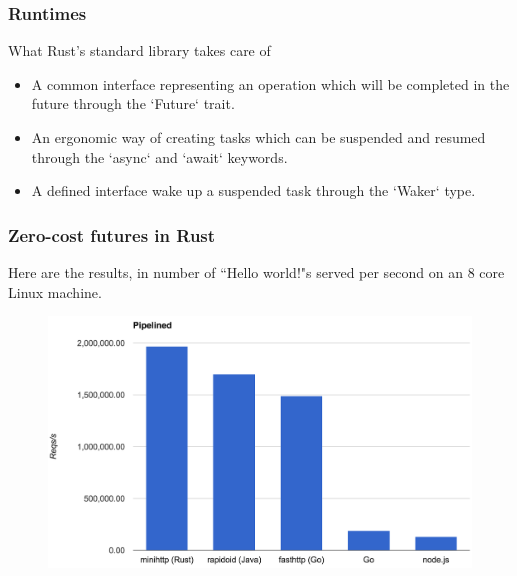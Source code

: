 \begin{frame}[fragile]
    \frametitle{Runtimes}
    {\color{red}What Rust's standard library takes care of}
    \begin{itemize}
        \item A {\color{red}common interface} representing an operation which will be completed in the future through the `Future` trait.
        \item An ergonomic way of {\color{red}creating tasks} which can be suspended and resumed through the `async` and `await` keywords.
        \item A defined interface wake up a suspended task through the `Waker` type.
    \end{itemize}
\end{frame}


\begin{frame}[fragile]
    \frametitle{Zero-cost futures in Rust}
% 
% 
Here are the results, in number of “Hello world!"s served per second on an 8 core Linux machine.
% 
    \begin{figure}
        
     
    \includegraphics[width=0.6\linewidth]{figs/bench-pipelined.png}
    \end{figure}
% 
\end{frame}

